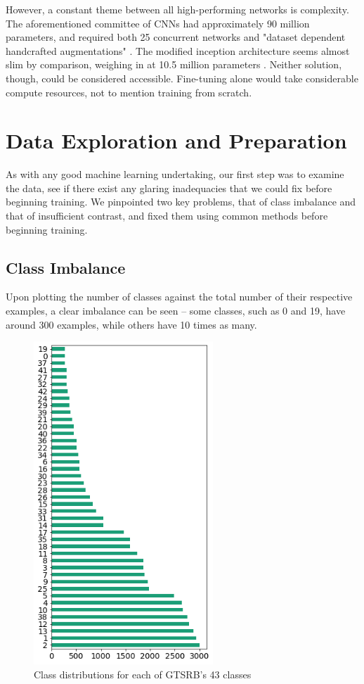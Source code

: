 \documentclass[10pt,twocolumn,letterpaper]{article}
\begin{document}
However, a constant theme between all high-performing networks is  complexity. The aforementioned committee of CNNs had approximately  90 million parameters, and required both 25 concurrent networks and "dataset dependent handcrafted augmentations" \cite{https://doi.org/10.48550/arxiv.1511.02992}. The modified inception architecture seems almost slim by comparison, weighing in  at 10.5 million parameters \cite{https://doi.org/10.48550/arxiv.1511.02992}. Neither solution, though, could be considered accessible. Fine-tuning alone would take considerable compute resources, not to mention training from scratch. 

\section{Data Exploration and Preparation}
As with any good machine learning undertaking, our first step was to examine the data, see if there exist any glaring inadequacies that we could fix before beginning training. We pinpointed two key problems, that of class imbalance and that of insufficient contrast, and fixed them using common methods before beginning training. 

\subsection{Class Imbalance}
Upon plotting the number of classes against the total number of their respective examples, a clear imbalance can be seen -- some classes, such as 0 and 19, have  around 300 examples, while others have 10 times as many. 

\begin{figure}[h]
\includegraphics[width=6.75cm]{class-distribution}
\centering
\caption{Class distributions for each of GTSRB's 43 classes}
\end{figure}
\end{document}
